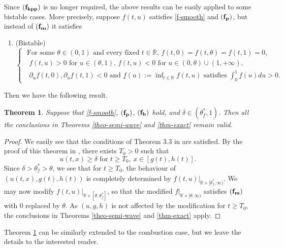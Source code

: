 \documentclass[11pt]{amsart}
\newtheorem{theorem}{Theorem}[section]
\numberwithin{equation}{section}
\begin{document}
Since  ${\bf (f_{kpp})}$ is no longer required, the above results can be easily applied to some bistable cases. More precisely, suppose $f(t,u)$ satisfies \eqref{f-smooth} and ${\bf (f_p)}$, but instead of ${\bf (f_m)}$ it satisfies
\begin{enumerate}
  \item[($\rm{\bf{f_b}}$):](Bistable) $\begin{cases} \mbox{ For some $\theta\in (0,1)$ and every fixed $t\in\mathbb R$, $f(t, 0)=f(t,\theta)=f(t,1)=0$,}\\
  \mbox{ $f(t, u)>0 $ for $u\in(\theta,1)$, $f(t, u)<0 $ for $u\in (0, \theta)\cup (1,+\infty)$, }\\
  \mbox{ $\partial_uf(t, 0), \partial_uf(t,1)<0$ and $\underline f(u):=\inf_{t\in\mathbb R}f(t,u)$ satisfies $\int_0^1\underline f(u)du>0$.}
  \end{cases}$
  \end{enumerate}
  Then we have the following result.
  \begin{theorem}\label{thm-bistable} Suppose that  \eqref{f-smooth}, ${\bf (f_p)} $, ${\bf (f_b)}$ hold, and $\delta\in (\theta^*_{\underline f}, 1)$.  Then all the conclusions in Theorems \ref{theo-semi-wave} and \ref{thm-exact} remain valid.  
  \end{theorem}
  \begin{proof}
  We easily see that the conditions of Theorem 3.3 in \cite{DLNN} are satisfied. By the proof of this theorem in \cite{DLNN}, there exists $T_0>0$ such that
  \[
  u(t,x)\geq \delta \mbox{ for } t\geq T_0,\ x\in [g(t), h(t)].
  \]
  Since $\delta>\theta^*_{\underline f}>\theta$, we see that for $t\geq T_0$, the behaviour of $(u(t,x), g(t), h(t))$ is completely determined by $f(t,u)|_{\mathbb R\times [\theta^*_{\underline f}, \infty)}$. We may now modify $f(t,u)|_{\mathbb R\times [\theta, \theta^*_{\underline f}]}$,  so that the modified $f|_{\mathbb R\times [\theta, \infty)}$ satisfies  ${\bf (f_m)}$ with $0$  replaced by $\theta$. As $(u,g,h)$ is not affected by the modification for $t\geq T_0$, the conclusions in Theorems \ref{theo-semi-wave} and \ref{thm-exact} apply.
    \end{proof}
  
  Theorem \ref{thm-bistable} can be similarly extended to the combustion case, but we leave the details to the interested reader.

\medskip
\end{document}
